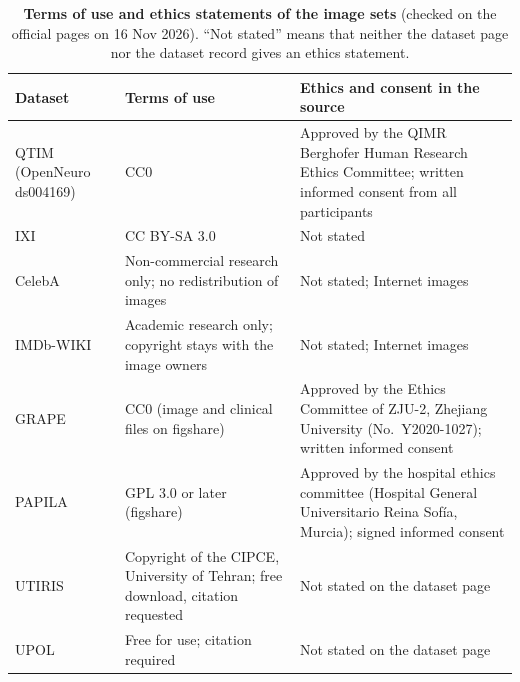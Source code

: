 \begin{table}[htbp]
\centering
\caption{\textbf{Terms of use and ethics statements of the image sets} (checked on the official pages on 16 Nov 2026).
``Not stated'' means that neither the dataset page nor the dataset record gives an ethics statement.}
\label{tab:s-terms}
\small
\begin{tabular}{@{}lp{}p{}@{}}
\toprule
Dataset & Terms of use & Ethics and consent in the source \\
\midrule
QTIM (OpenNeuro ds004169) & CC0 & Approved by the QIMR Berghofer Human Research Ethics Committee; written informed consent from all participants \\
IXI & CC BY-SA 3.0 & Not stated \\
CelebA & Non-commercial research only; no redistribution of images & Not stated; Internet images \\
IMDb-WIKI & Academic research only; copyright stays with the image owners & Not stated; Internet images \\
GRAPE & CC0 (image and clinical files on figshare) & Approved by the Ethics Committee of ZJU-2, Zhejiang University (No.~Y2020-1027); written informed consent \\
PAPILA & GPL 3.0 or later (figshare) & Approved by the hospital ethics committee (Hospital General Universitario Reina Sof\'ia, Murcia); signed informed consent \\
UTIRIS & Copyright of the CIPCE, University of Tehran; free download, citation requested & Not stated on the dataset page \\
UPOL & Free for use; citation required & Not stated on the dataset page \\
\bottomrule
\end{tabular}
\end{table}

